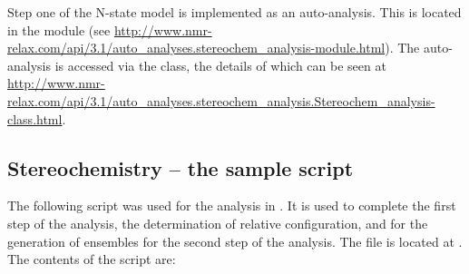 Step one of the N-state model is implemented as an auto-analysis.
This is located in the module  (see \url{http://www.nmr-relax.com/api/3.1/auto_analyses.stereochem_analysis-module.html}).
The auto-analysis is accessed via the  class, the details of which can be seen at \url{http://www.nmr-relax.com/api/3.1/auto_analyses.stereochem_analysis.Stereochem_analysis-class.html}.



\subsection{Stereochemistry -- the sample script}

The following script was used for the analysis in \citet{Sun11}.
It is used to complete the first step of the analysis, the determination of relative configuration, and for the generation of ensembles for the second step of the analysis.
The file is located at .
The contents of the script are:


